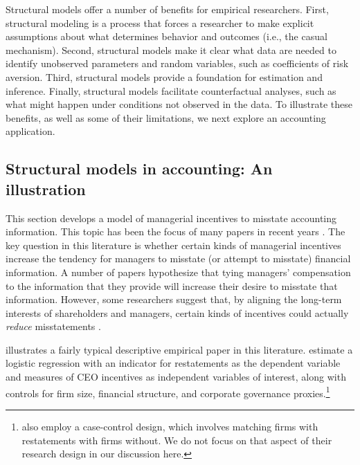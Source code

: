 \documentclass[12pt,reqno,titlepage]{amsart}
\theoremstyle{definition}
\begin{document}
\begin{doublespace}
Structural models offer a number of benefits for empirical researchers.
First, structural modeling is a process that forces a researcher to make explicit assumptions about what determines behavior and outcomes (i.e., the casual mechanism). 
Second, structural models make it clear what data are needed to identify unobserved parameters and random variables, such as coefficients of risk aversion.
Third, structural models provide a foundation for estimation and inference. 
Finally, structural models facilitate counterfactual analyses, such as what might happen under conditions not observed in the data. 
To illustrate these benefits, as well as some of their limitations, we next explore an accounting application.

\subsection{Structural models in accounting: An illustration}
This section develops a model of managerial incentives to misstate accounting information. 
This topic has been the focus of many papers in recent years \citep[see the review in][]{Armstrong:2010jd}.
The key question in this literature is whether certain kinds of managerial incentives increase the tendency for managers to misstate (or attempt to misstate) financial information.
A number of papers hypothesize that tying managers' compensation to the information that they provide will increase their desire to misstate that information.
However, some researchers suggest that, by aligning the long-term interests of shareholders and managers, certain kinds of incentives could actually \emph{reduce} misstatements \citep{Burns:2006ce}.

\citet{Efendi:2007ja} illustrates a fairly typical descriptive empirical paper in this literature. 
\citet[p.\,687]{Efendi:2007ja} estimate a logistic regression with an indicator for restatements as the dependent variable and measures of CEO incentives as independent variables of interest, along with controls for firm size, financial structure, and corporate governance proxies.\footnote{
\citet{Efendi:2007ja} also employ a case-control design, which involves matching firms with restatements with firms without.
We do not focus on that aspect of their research design in our discussion here.}
 

\end{doublespace}
\end{document}
